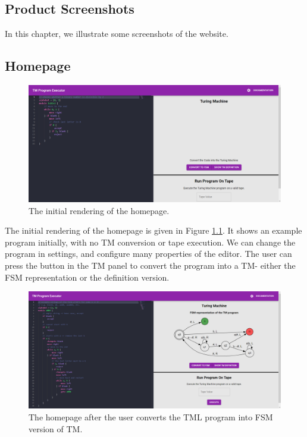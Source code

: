 \begin{appendices}
\chapter{Product Screenshots}
In this chapter, we illustrate some screenshots of the website.

\section{Homepage}
\begin{figure}[htb]
    \centering
    \includegraphics[scale=0.18]{images/Homepage at start.png}
    \caption{The initial rendering of the homepage.}
    \label{fig:homepage_initial}
\end{figure}
The initial rendering of the homepage is given in Figure \ref{fig:homepage_initial}. It shows an example program initially, with no TM conversion or tape execution. We can change the program in settings, and configure many properties of the editor. The user can press the button in the TM panel to convert the program into a TM- either the FSM representation or the definition version.

\begin{figure}[htb]
    \centering
    \includegraphics[scale=0.18]{images/Homepage w. TM.png}
    \caption{The homepage after the user converts the TML program into FSM version of TM.}
    \label{fig:homepage_tm_conversion_fsm}
\end{figure}


\end{appendices}
